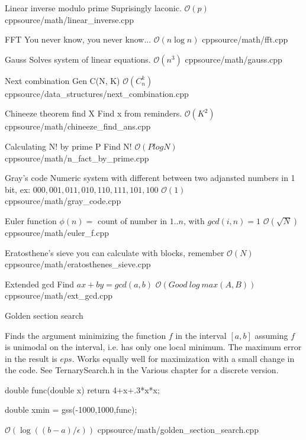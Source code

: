\documentclass[landscape, 10pt, a4paper, oneside, twocolumn]{extarticle}
\begin{document}
\Algorithm
{Linear inverse modulo prime}
{Suprisingly laconic.}
{$\mathcal{O}(p)$}
{cpp}{source/math/linear_inverse.cpp}

\Algorithm
{FFT}
{You never know, you never know...}
{$\mathcal{O}(n \log n)$}
{cpp}{source/math/fft.cpp}

\Algorithm
{Gauss}
{Solves system of linear equations.}
{$\mathcal{O}(n^{3})$}
{cpp}{source/math/gauss.cpp}

\Algorithm
{Next combination}
{Gen C(N, K)}
{$\mathcal{O}(C_{n}^{k})$}
{cpp}{source/data_structures/next_combination.cpp}

\Algorithm
{Chineeze theorem find X}
{Find x from reminders.}
{$\mathcal{O}(K^{2})$}
{cpp}{source/math/chineeze_find_ans.cpp}

\Algorithm
{Calculating N! by prime P}
{Find N!}
{$\mathcal{O}(P log N)$}
{cpp}{source/math/n_fact_by_prime.cpp}

\Algorithm
{Gray's code}
{Numeric system with different between two adjansted numbers in 1 bit, ex: $000, 001, 011, 010, 110, 111, 101, 100$}
{$\mathcal{O}(1)$}
{cpp}{source/math/gray_code.cpp}

\Algorithm
{Euler function}
{$\phi(n) = $ count of number in $1..n$, with $gcd(i, n) = 1$}
{$\mathcal{O}(\sqrt{N})$}
{cpp}{source/math/euler_f.cpp}

\Algorithm
{Eratosthene's sieve}
{you can calculate with blocks, remember}
{$\mathcal{O}(N)$}
{cpp}{source/math/eratosthenes_sieve.cpp}

\Algorithm
{Extended gcd}
{Find $a x + b y = gcd(a, b)$}
{$\mathcal{O}(Good\ log\ max(A, B))$}
{cpp}{source/math/ext_gcd.cpp}

\Algorithm
{Golden section search}
{Finds the argument minimizing the function $f$ in the interval $[a,b]$ assuming $f$ is unimodal on the interval, i.e. has only one local minimum. The maximum error in the result is $eps$. Works equally well for maximization with a small change in the code. See TernarySearch.h in the Various chapter for a discrete version.

double func(double x) { return 4+x+.3*x*x; }

double xmin = gss(-1000,1000,func);}
{$\mathcal{O}(\log((b-a) / \epsilon))$}
{cpp}{source/math/golden_section_search.cpp}
\end{document}
